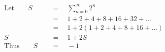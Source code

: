 \begin{align*}
\mathrm{Let}\qquad S\quad&\,=\quad\sum_{n=0}^\infty 2^n\\
\,&\,=\quad1+2+4+8+16+32+...\\
\,&\,=\quad1+2(1+2+4+8+16+...)\\
S\quad&\,=\quad1+2S\\
\mathrm{Thus}\qquad S\quad&\,=\quad-1
\end{align*}

